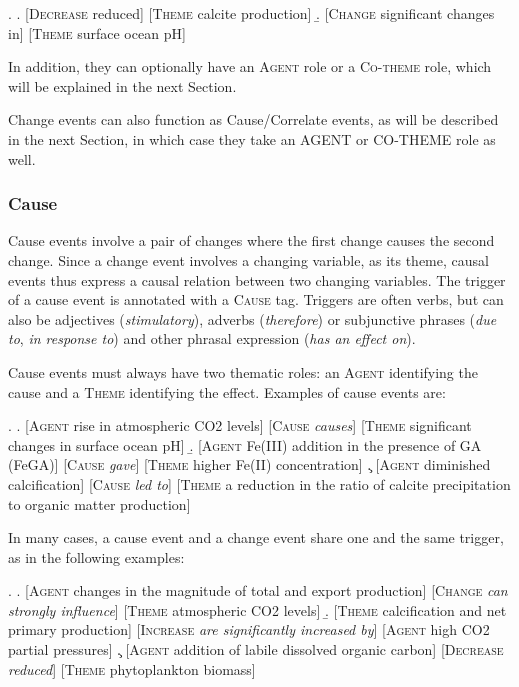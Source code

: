 \documentclass[10pt, a4paper]{article}
\newcommand{\tag}[1]{\textsc{#1}}
\begin{document}
\exi.
  \a. [\tag{Decrease} reduced] [\tag{Theme} calcite production]
  \b. [\tag{Change} significant changes in] [\tag{Theme} surface ocean pH]

In addition, they can optionally have an \tag{Agent} role or a \tag{Co-theme} role, which will be explained in the next Section.

Change events can also function as Cause/Correlate events, as will be described in the next Section, in which case they take an AGENT or CO-THEME role as well.


\subsubsection{Cause}

Cause events involve a pair of changes where the first change causes the second change.
Since a change event involves a changing variable, as its theme, causal events thus express a causal relation between two changing variables. 
The trigger of a cause event is annotated with a \tag{Cause} tag.
Triggers are often verbs, but can also be adjectives (\emph{stimulatory}), adverbs (\emph{therefore}) or subjunctive phrases (\emph{due to}, \emph{in response to}) and other phrasal expression (\emph{has an effect on}).  

Cause events must always have two thematic roles: an \tag{Agent} identifying the cause and a \tag{Theme} identifying the effect. 
Examples of cause events are:

\exi.
  \a. [\tag{Agent} rise in atmospheric CO2 levels] [\tag{Cause} \emph{causes}] [\tag{Theme} significant changes in surface ocean pH]
  \b. [\tag{Agent} Fe(III) addition in the presence of GA (FeGA)] [\tag{Cause} \emph{gave}] [\tag{Theme} higher Fe(II) concentration]
  \c. [\tag{Agent} diminished calcification] [\tag{Cause} \emph{led to}] [\tag{Theme} a reduction in the ratio of calcite precipitation to organic matter production]

In many cases, a cause event and a change event share one and the same trigger, as in the following examples:

\exi.
  \a. [\tag{Agent} changes in the magnitude of total and export production] [\tag{Change} \emph{can strongly influence}] [\tag{Theme} atmospheric CO2 levels]
  \b. [\tag{Theme} calcification and net primary production] [\tag{Increase} \emph{ are significantly increased by}] [\tag{Agent} high CO2 partial pressures]
  \c. [\tag{Agent} addition of labile dissolved organic carbon] [\tag{Decrease}  \emph{reduced}] [\tag{Theme} phytoplankton biomass]
\end{document}
